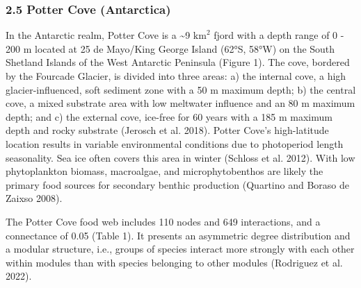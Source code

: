 \documentclass[
]{article}
\begin{document}
\subsubsection{2.5 Potter Cove
(Antarctica)}\label{potter-cove-antarctica}

In the Antarctic realm, Potter Cove is a \textasciitilde9
\(\text{km}^2\) fjord with a depth range of 0 - 200 m located at 25 de
Mayo/King George Island (62°S, 58°W) on the South Shetland Islands of
the West Antarctic Peninsula (Figure 1). The cove, bordered by the
Fourcade Glacier, is divided into three areas: a) the internal cove, a
high glacier-influenced, soft sediment zone with a 50 m maximum depth;
b) the central cove, a mixed substrate area with low meltwater influence
and an 80 m maximum depth; and c) the external cove, ice-free for 60
years with a 185 m maximum depth and rocky substrate (Jerosch et al.
2018). Potter Cove's high-latitude location results in variable
environmental conditions due to photoperiod length seasonality. Sea ice
often covers this area in winter (Schloss et al. 2012). With low
phytoplankton biomass, macroalgae, and microphytobenthos are likely the
primary food sources for secondary benthic production (Quartino and
Boraso de Zaixso 2008).

The Potter Cove food web includes 110 nodes and 649 interactions, and a
connectance of 0.05 (Table 1). It presents an asymmetric degree
distribution and a modular structure, i.e., groups of species interact
more strongly with each other within modules than with species belonging
to other modules (Rodriguez et al. 2022).
\end{document}
